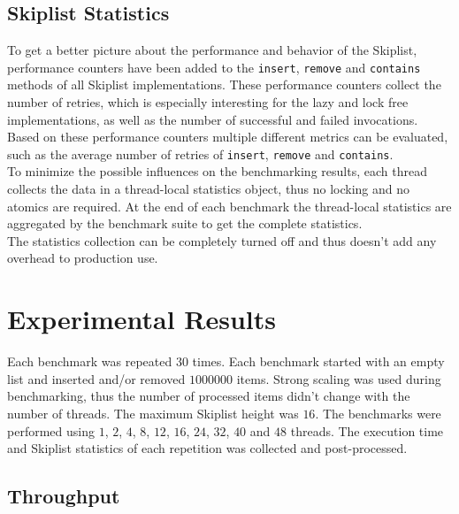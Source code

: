 \subsection{Skiplist Statistics}
To get a better picture about the performance and behavior of the Skiplist, performance counters have been added to the \texttt{insert}, \texttt{remove} and \texttt{contains} methods of all Skiplist implementations. These performance counters collect the number of retries, which is especially interesting for the lazy and lock free implementations, as well as the number of successful and failed invocations. Based on these performance counters multiple different metrics can be evaluated, such as the average number of retries of \texttt{insert}, \texttt{remove} and \texttt{contains}.\\

\noindent To minimize the possible influences on the benchmarking results, each thread collects the data in a thread-local statistics object, thus no locking and no atomics are required. At the end of each benchmark the thread-local statistics are aggregated by the benchmark suite to get the complete statistics.\\

\noindent The statistics collection can be completely turned off and thus doesn't add any overhead to production use.

\section{Experimental Results}

Each benchmark was repeated $30$ times. Each benchmark started with an empty list and inserted and/or removed $1000000$ items. Strong scaling was used during benchmarking, thus the number of processed items didn't change with the number of threads. The maximum Skiplist height was $16$. The benchmarks were performed using $1$, $2$, $4$, $8$, $12$, $16$, $24$, $32$, $40$ and $48$ threads. The execution time and Skiplist statistics of each repetition was collected and post-processed.

\subsection{Throughput}

